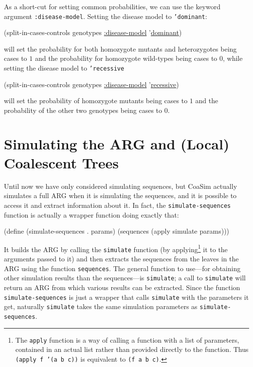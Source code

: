 \documentclass{manual}
\begin{document}
As a short-cut for setting common probabilities, we can use the
keyword argument \texttt{:disease-model}.  Setting the disease model
to \texttt{'dominant}:
\begin{code}
(split-in-cases-controls genotypes \underline{:disease-model} '\underline{dominant})
\end{code}
will set the probability for both homozygote mutants and heterozygotes
being cases to $1$ and the probability for homozygote wild-types being
cases to $0$, while setting the disease model to \texttt{'recessive}
\begin{code}
(split-in-cases-controls genotypes \underline{:disease-model} '\underline{recessive})
\end{code}
will set the probability of homozygote mutants being cases to $1$ and
the probability of the other two genotypes being cases to $0$.



\section{Simulating the ARG and (Local) Coalescent Trees}
\label{sec:simul-coal-trees}

Until now we have only considered simulating sequences, but CoaSim
actually simulates a full ARG when it is simulating the sequences, and
it is possible to access it and extract information about it.  In
fact, the \texttt{simulate-sequences} function is actually a wrapper
function doing exactly that:
\begin{code}
(define (simulate-sequences . params)
  (sequences (apply simulate params)))
\end{code}
It builds the ARG by calling the \texttt{simulate} function (by
applying\footnote{The \texttt{apply} function is a way of
  calling a function with a list of parameters, contained in an actual
  list rather than provided directly to the function.  Thus
  \texttt{(apply f '(a b c))} is equivalent to \texttt{(f a b c)}.} it
to the arguments passed to it) and then extracts the sequences from
the leaves in the ARG using the function \texttt{sequences}.  The
general function to use---for obtaining other simulation results than
the sequences---is \texttt{simulate}; a call to \texttt{simulate} will
return an ARG from which various results can be extracted.  Since the
function \texttt{simulate-sequences} is just a wrapper that calls
\texttt{simulate} with the parameters it get, naturally
\texttt{simulate} takes the same simulation parameters as
\texttt{simulate-sequences}.
\end{document}
